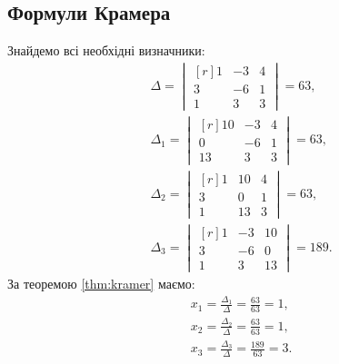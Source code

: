 \subsection{Формули Крамера}
\solving
Знайдемо всі необхідні визначники:
\begin{align}
	&\Delta=\begin{vmatrix*}[r]
		1&-3&4\\
		3&-6&1\\
		1&3&3
	\end{vmatrix*}=63,\\
	&\Delta_1=\begin{vmatrix*}[r]
		10&-3&4\\
		0&-6&1\\
		13&3&3
	\end{vmatrix*}=63,\\
&\Delta_2=\begin{vmatrix*}[r]
	1&10&4\\
	3&0&1\\
	1&13&3
\end{vmatrix*}=63,\\
&\Delta_3=\begin{vmatrix*}[r]
	1&-3&10\\
	3&-6&0\\
	1&3&13
\end{vmatrix*}=189.
\end{align}
За теоремою \ref{thm:kramer} маємо:
\begin{align}
	&x_1=\frac{\Delta_1}{\Delta}=\frac{63}{63}=1,\\
	&x_2=\frac{\Delta_2}{\Delta}=\frac{63}{63}=1,\\
	&x_3=\frac{\Delta_3}{\Delta}=\frac{189}{63}=3.
\end{align}
